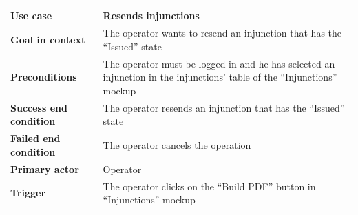 {{{			\begin{center}
			\begin{tabular}{|p{4cm}|p{10cm}|}
			\hline
				\centering \vspace{1mm} \bfseries{Use case} \vspace{1mm} & 
				\vspace{1mm} Resends injunctions \vspace{1mm}\\
			\hline
				\centering \vspace{1mm} \bfseries{Goal in context} \vspace{1mm} & 
				\vspace{1mm} The operator wants to resend an injunction that has the “Issued” state \vspace{1mm}\\
			\hline
				\centering \vspace{1mm} \bfseries{Preconditions} \vspace{1mm} & 
				\vspace{1mm} The operator must be logged in and he has selected an injunction in the injunctions’ table of the “Injunctions” mockup \vspace{1mm}\\
			\hline
				\centering \vspace{1mm} \bfseries{Success end condition} \vspace{1mm} & 
				\vspace{1mm} The operator resends an injunction that has the “Issued” state	 \vspace{1mm}\\
			\hline
				\centering \vspace{1mm} \bfseries{Failed end condition} \vspace{1mm} & 
				\vspace{1mm} The operator cancels the operation \vspace{1mm}\\
			\hline
				\centering \vspace{1mm} \bfseries{Primary actor} \vspace{1mm} & 
				\vspace{1mm} Operator \vspace{1mm}\\
			\hline
				\centering \vspace{1mm} \bfseries{Trigger} \vspace{1mm} & 
				\vspace{1mm}The operator clicks on the “Build PDF” button in “Injunctions” mockup \vspace{1mm}\\
			\hline
			\end{tabular}


\end{center}}}}
